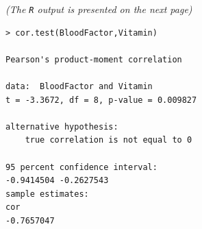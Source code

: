 \documentclass[a4paper,12pt]{article}
\begin{document}
\begin{itemize}
\textit{(The \texttt{R} output is presented on the next page)}
\newpage

\begin{framed}
\begin{verbatim}
> cor.test(BloodFactor,Vitamin)

Pearson's product-moment correlation

data:  BloodFactor and Vitamin
t = -3.3672, df = 8, p-value = 0.009827

alternative hypothesis: 
	true correlation is not equal to 0
	
95 percent confidence interval:
-0.9414504 -0.2627543
sample estimates:
cor 
-0.7657047 

\end{verbatim}
\end{framed}
\end{itemize}


\end{document}

